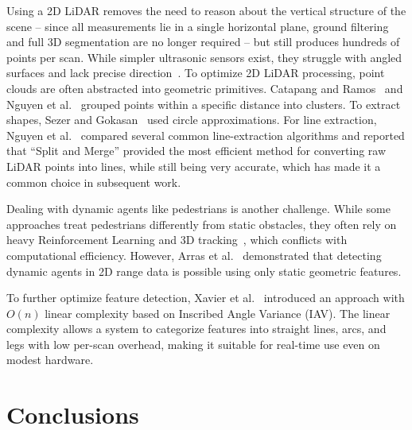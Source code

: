 Using a 2D LiDAR removes the need to reason about the vertical structure of the scene -- since all measurements lie in a single horizontal plane, ground filtering and full 3D segmentation are no longer required -- but still produces hundreds of points per scan. 
While simpler ultrasonic sensors exist, they struggle with angled surfaces and lack precise direction~\cite{borenstein1988ultrasonic}. To optimize 2D LiDAR processing, point clouds are often abstracted into geometric primitives. Catapang and Ramos~\cite{catapang2016lidar} and Nguyen et al.~\cite{nguyen2005lineextraction} grouped points within a specific distance into clusters. To extract shapes, Sezer and Gokasan~\cite{sezer2012follow} used circle approximations. For line extraction, Nguyen et al.~\cite{nguyen2005lineextraction} compared several common line-extraction algorithms and reported that ``Split and Merge'' provided the most efficient method for converting raw LiDAR points into lines, while still being very accurate, which has made it a common choice in subsequent work.

Dealing with dynamic agents like pedestrians is another challenge. While some approaches treat pedestrians differently from static obstacles, they often rely on heavy Reinforcement Learning and 3D tracking~\cite{du2019groupsurfing}, which conflicts with computational efficiency. However, Arras et al.~\cite{arras2007people} demonstrated that detecting dynamic agents in 2D range data is possible using only static geometric features.

To further optimize feature detection, Xavier et al.~\cite{xavier2005circledetection} introduced an approach with $O(n)$ linear complexity based on Inscribed Angle Variance (IAV). The linear complexity allows a system to categorize features into straight lines, arcs, and legs with low per-scan overhead, making it suitable for real-time use even on modest hardware.

\section{Conclusions}
\label{sec:rw-conclusions}


